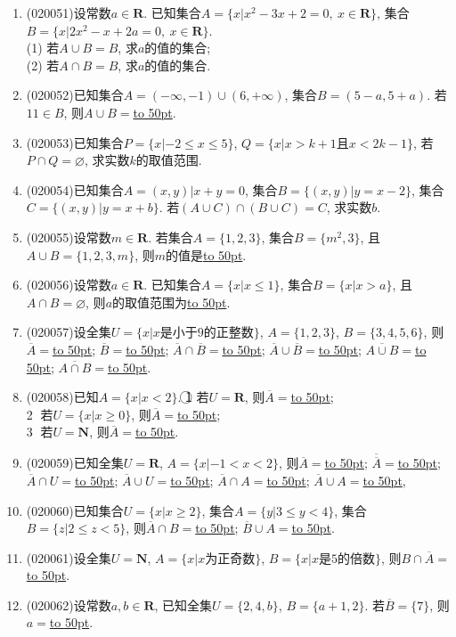 \documentclass[10pt,a4paper]{article}
\newcommand{\blank}[1]{\underline{\hbox to #1pt{}}}
\begin{document}
\begin{enumerate}[1.]
\item {\tiny (020051)}设常数$a\in \mathbf{R}$. 已知集合$A=\{x|x^2-3x+2=0, \ x\in\mathbf{R}\}$, 集合$B=\{x|2x^2-x+2a=0,\  x\in\mathbf{R}\}$.\\ (1) 若$A\cup B=B$, 求$a$的值的集合;\\
(2) 若$A\cap B=B$, 求$a$的值的集合.
\item {\tiny (020052)}已知集合$A=(-\infty, -1)\cup(6, +\infty)$, 集合$B=(5-a, 5+a)$. 若$11\in B$, 则$A\cup B=$\blank{50}.
\item {\tiny (020053)}已知集合$P=\{ x|-2\le x\le 5\}$, $Q=\{x|x>k+1$且$x<2k-1\}$, 若$P\cap Q=\varnothing$, 求实数$k$的取值范围.
\item {\tiny (020054)}已知集合$A={(x, y)|x+y=0}$, 集合$B=\{(x,y)|y=x-2\}$, 集合$C=\{(x,y)|y=x+b\}$. 若$(A\cup C)\cap(B\cup C)=C$, 求实数$b$.
\item {\tiny (020055)}设常数$m\in \mathbf{R}$. 若集合$A=\{1,2,3\}$, 集合$B=\{m^2,3\}$, 且$A\cup B=\{1,2,3,m\}$, 则$m$的值是\blank{50}.
\item {\tiny (020056)}设常数$a\in \mathbf{R}$. 已知集合$A=\{x| x\le 1\}$, 集合$B=\{x| x>a\}$, 且$A\cap B=\varnothing$, 则$a$的取值范围为\blank{50}.
\item {\tiny (020057)}设全集$U=\{x|x\text{是小于}9\text{的正整数}\}$, $A=\{1,2,3\}$, $B=\{3,4,5,6\}$, 则$\overline A=$\blank{50}; $\overline B=$\blank{50}; $\overline A\cap\overline B=$\blank{50}; $
\overline A\cup\overline B=$\blank{50}; $\overline{A\cup B}=$\blank{50}; $\overline{A\cap B}=$\blank{50}.
\item {\tiny (020058)}已知$A=\{x|x<2\}$.
\textcircled{1} 若$U=\mathbf{R}$, 则$\overline A=$\blank{50};\\
\textcircled{2} 若$U=\{x|x\ge 0\}$, 则$\overline A=$\blank{50};\\
\textcircled{3} 若$U= \mathbf{N}$, 则$\overline A=$\blank{50}.
\item {\tiny (020059)}已知全集$U=\mathbf{R}$, $A=\{x|-1<x<2\}$, 则$\overline A=$\blank{50}; $\overline{\overline A}=$\blank{50}; $\overline A\cap U=$\blank{50}; $\overline A\cup U=$\blank{50}; $\overline A\cap A=$\blank{50}; $\overline A\cup A=$\blank{50},
\item {\tiny (020060)}已知集合$U=\{x|x\ge 2\}$, 集合$A=\{y|3\le y<4\}$, 集合$B=\{z|2\le z<5\}$, 则$\overline A\cap B=$\blank{50}; $\overline B\cup A=$\blank{50}.
\item {\tiny (020061)}设全集$U=\mathbf{N}$, $A=\{x|x\text{为正奇数}\}$, $B=\{x|x\text{是}5\text{的倍数}\}$, 则$B\cap\overline A=$\blank{50}.
\item {\tiny (020062)}设常数$a,b\in \mathbf{R}$, 已知全集$U=\{2, 4, b\}$, $B=\{a+1, 2\}$.  若$\overline B=\{7\}$, 则$a=$\blank{50}.

\end{enumerate}
\end{document}
